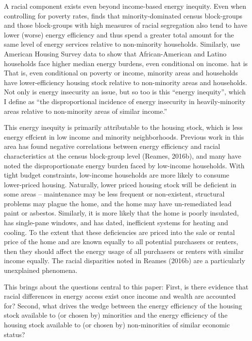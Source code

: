 \documentclass[
]{article}
\begin{document}
A racial component exists even beyond income-based energy inequity. Even when controlling for poverty rates, \citet{Reames2016}
finds that minority-dominated census block-groups and those block-groups with
high measures of racial segregation also tend to have lower (worse) energy efficiency and
thus spend a greater total amount for the same level of energy services relative
to non-minority households. Similarly, \citet{Drehobl2016} use American Housing Survey data to show that African-American and Latino households
face higher median energy burdens, even conditional on income. hat is That is, even conditional on poverty or income, minority areas and households
have lower-efficiency housing stock relative to non-minority areas and households. Not only is energy insecurity an issue, but so too is this ``energy inequity'',
which I define as ``the disproportional incidence of energy insecurity in heavily-minority areas
relative to non-minority areas of similar income.''

This energy inequity is primarily attributable to the housing stock, which is less energy effcient in low income and minority neighborhoods. Previous work in this area has found negative correlations between energy efficiency and racial characteristics at the census block-group level (Reames, 2016b), and many have noted the disproportionate energy burden faced by low-income households. With tight budget constraints, low-income households are more likely to consume lower-priced housing. Naturally, lower priced housing stock will be deficient
in some areas -- maintenance may be less frequent or non-existent, structural problems may plague the home, and the home may have un-remediated lead paint or asbestos. Similarly,
it is more likely that the home is poorly insulated, has single-pane windows, and has dated, inefficient systems for heating and cooling. To the extent that these deficiencies are priced into the sale or rental price of the home and are known equally to all potential purchasers or renters, then they should affect the energy usage of all purchasers or renters with similar income equally. The racial disparities noted in Reames (2016b) are a particularly unexplained phenomena.

This brings about the questions central to this paper: First, is there evidence that racial differences in
energy access exist once income and wealth are accounted for? Second, what drives the wedge between the energy
efficiency of the housing stock available to (or chosen by) minorities and the energy efficiency of
the housing stock available to (or chosen by) non-minorities of similar economic status?
\end{document}
